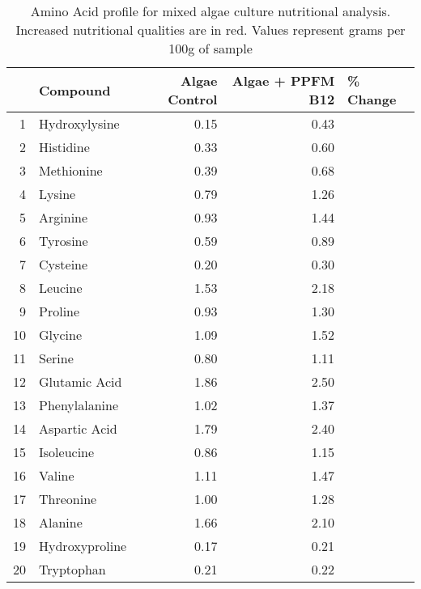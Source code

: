 \begin{table}[ht]
\centering
{\small
\begin{tabular}{rlrrl}
  \hline
 & Compound & Algae Control & Algae + PPFM B12 & \% Change \\ 
  \hline
1 & Hydroxylysine & 0.15 & 0.43 & \textbf{\color{red}{186.67}} \\ 
  2 & Histidine & 0.33 & 0.60 & \textbf{\color{red}{81.82}} \\ 
  3 & Methionine & 0.39 & 0.68 & \textbf{\color{red}{74.36}} \\ 
  4 & Lysine & 0.79 & 1.26 & \textbf{\color{red}{59.49}} \\ 
  5 & Arginine & 0.93 & 1.44 & \textbf{\color{red}{54.84}} \\ 
  6 & Tyrosine & 0.59 & 0.89 & \textbf{\color{red}{50.85}} \\ 
  7 & Cysteine & 0.20 & 0.30 & \textbf{\color{red}{50.00}} \\ 
  8 & Leucine & 1.53 & 2.18 & \textbf{\color{red}{42.48}} \\ 
  9 & Proline & 0.93 & 1.30 & \textbf{\color{red}{39.78}} \\ 
  10 & Glycine & 1.09 & 1.52 & \textbf{\color{red}{39.45}} \\ 
  11 & Serine & 0.80 & 1.11 & \textbf{\color{red}{38.75}} \\ 
  12 & Glutamic Acid & 1.86 & 2.50 & \textbf{\color{red}{34.41}} \\ 
  13 & Phenylalanine & 1.02 & 1.37 & \textbf{\color{red}{34.31}} \\ 
  14 & Aspartic Acid & 1.79 & 2.40 & \textbf{\color{red}{34.08}} \\ 
  15 & Isoleucine & 0.86 & 1.15 & \textbf{\color{red}{33.72}} \\ 
  16 & Valine & 1.11 & 1.47 & \textbf{\color{red}{32.43}} \\ 
  17 & Threonine & 1.00 & 1.28 & \textbf{\color{red}{28.00}} \\ 
  18 & Alanine & 1.66 & 2.10 & \textbf{\color{red}{26.51}} \\ 
  19 & Hydroxyproline & 0.17 & 0.21 & \textbf{\color{red}{23.53}} \\ 
  20 & Tryptophan & 0.21 & 0.22 & \textbf{\color{red}{4.76}} \\ 
   \hline
\end{tabular}
}
\caption{Amino Acid profile for mixed algae culture nutritional analysis. Increased nutritional qualities are in red. Values represent grams per 100g of sample} 
\label{tab:AminoAcids_trim}
\end{table}
